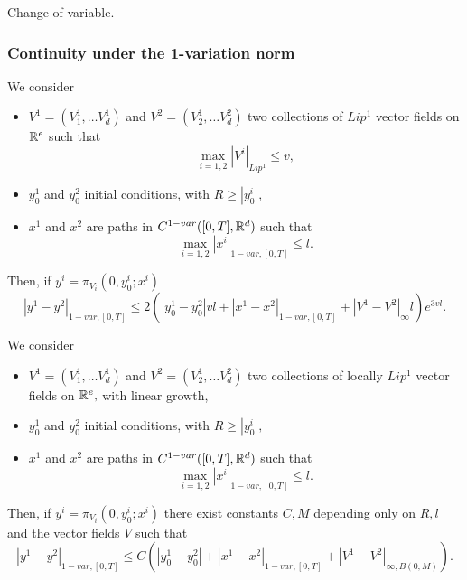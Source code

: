 \begin{exercise}
    Change of variable.
\end{exercise}

\subsubsection{Continuity under the 1-variation norm}

\begin{theorem}
    We consider
    \begin{itemize}
        \item $V^1 = (V_1^1, \ldots V^1_d)$ and $V^2 = (V_2^1, \ldots V^2_d)$ two collections of $Lip^1$ vector fields on $\mathbb{R}^e$ such that
        \begin{equation}
            \max_{i=1,2} |V^i|_{Lip^1} \leq v,
        \end{equation}
        \item $y_0^1$ and $y_0^2$ initial conditions, with $R \geq |y_0^i|,$
        \item $x^1$ and $x^2$ are paths in $C^{1-var}([0,T], \mathbb{R}^d)$ such that 
        \begin{equation}
            \max_{i=1,2} |x^i|_{1-var, [0,T]} \leq l.
        \end{equation} 
    \end{itemize}

    Then, if $y^i = \pi_{V_i}(0, y_0^i; x^i)$
    \begin{equation}
        |y^1 - y^2|_{1-var,[0,T]} \leq 2 \left( |y_0^1 - y_0^2| v l + |x^1 - x^2|_{1-var,[0,T]} + |V^1 - V^2|_\infty l \right) e^{3vl}.
    \end{equation}
\end{theorem}

\begin{corollary}
        We consider
    \begin{itemize}
        \item $V^1 = (V_1^1, \ldots V^1_d)$ and $V^2 = (V_2^1, \ldots V^2_d)$ two collections of locally $Lip^1$ vector fields on $\mathbb{R}^e,$ with linear growth,
        \item $y_0^1$ and $y_0^2$ initial conditions, with $R \geq |y_0^i|,$
        \item $x^1$ and $x^2$ are paths in $C^{1-var}([0,T], \mathbb{R}^d)$ such that 
        \begin{equation}
            \max_{i=1,2} |x^i|_{1-var, [0,T]} \leq l.
        \end{equation} 
    \end{itemize}

    Then, if $y^i = \pi_{V_i}(0, y_0^i; x^i)$ there exist constants $C, M$ depending only on $R, l$ and the vector fields $V$ such that
    \begin{equation}
        |y^1 - y^2|_{1-var,[0,T]} \leq C \left( |y_0^1 - y_0^2| + |x^1 - x^2|_{1-var,[0,T]} + |V^1 - V^2|_{\infty, B(0,M)} \right).
    \end{equation}
\end{corollary}

